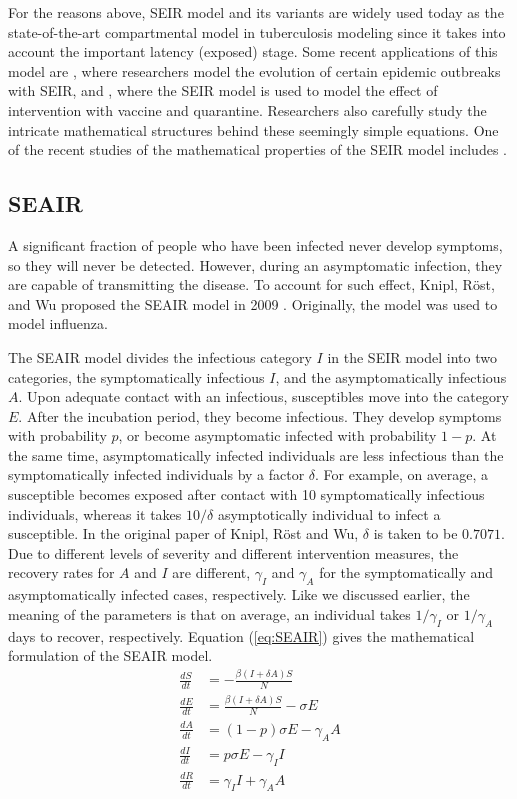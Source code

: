 \documentclass[8pt,twocolumn]{extarticle}
\begin{document}
For the reasons above, SEIR model and its variants are widely used today as the state-of-the-art compartmental model in tuberculosis modeling since it takes into account the important latency (exposed) stage. Some recent applications of this model are \cite{SEIRapp1,SEIRapp2,SEIRapp3}, where researchers model the evolution of certain epidemic outbreaks with SEIR, and \cite{SEIRitv1}, where the SEIR model is used to model the effect of intervention with vaccine and quarantine. Researchers also carefully study the intricate mathematical structures behind these seemingly simple equations. One of the recent studies of the mathematical properties of the SEIR model includes \cite{SEIRstd1}.

\subsection{SEAIR}
A significant fraction of people who have been infected never develop symptoms, so they will never be detected. However, during an asymptomatic infection, they are capable of transmitting the disease. To account for such effect, Knipl, R\"{o}st, and Wu proposed the SEAIR model in 2009 \cite{SEAIR}. Originally, the model was used to model influenza.

The SEAIR model divides the infectious category $I$ in the SEIR model into two categories, the symptomatically infectious $I$, and the asymptomatically infectious $A$. Upon adequate contact with an infectious, susceptibles move into the category $E$. After the incubation period, they become infectious. They develop symptoms with probability $p$, or become asymptomatic infected with probability $1 - p$. At the same time, asymptomatically infected individuals are less infectious than the symptomatically infected individuals by a factor $\delta$. For example, on average, a susceptible becomes exposed after contact with 10 symptomatically infectious individuals, whereas it takes $10/\delta$ asymptotically individual to infect a susceptible. In the original paper of Knipl, R\"{o}st and Wu, $\delta$ is taken to be $0.7071$. Due to different levels of severity and different intervention measures, the recovery rates for $A$ and $I$ are different, $\gamma_I$ and $\gamma_A$ for the symptomatically and asymptomatically infected cases, respectively. Like we discussed earlier, the meaning of the parameters is that on average, an individual takes $1/\gamma_I$ or $1/\gamma_A$ days to recover, respectively. Equation (\ref{eq:SEAIR}) gives the mathematical formulation of the SEAIR model.
\begin{align}
\frac{dS}{dt} &= -\frac{\beta (I + \delta A)S}{N} \nonumber\\
\frac{dE}{dt} &= \frac{\beta (I + \delta A)S}{N}- \sigma E \nonumber\\
\frac{dA}{dt} &= (1-p)\sigma E - \gamma_A A \nonumber\\
\frac{dI}{dt} &= p\sigma E - \gamma_I I \nonumber\\
\frac{dR}{dt} &= \gamma_I I + \gamma_A A \label{eq:SEAIR}
\end{align}
\end{document}
